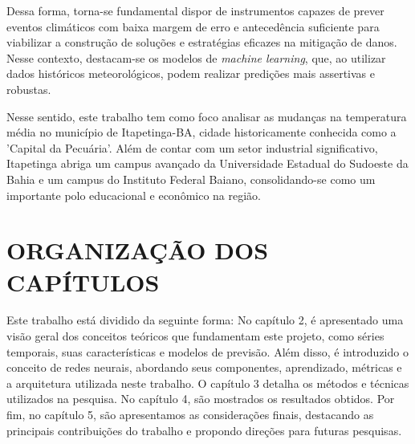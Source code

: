     
    Dessa forma, torna-se fundamental dispor de instrumentos capazes de prever eventos climáticos com baixa margem de erro 
    e antecedência suficiente para viabilizar a construção de soluções e estratégias eficazes na mitigação de danos. 
    Nesse contexto, destacam-se os modelos de \emph{machine learning}, que, ao utilizar dados históricos meteorológicos, podem 
    realizar predições mais assertivas e robustas.
    
    Nesse sentido, este trabalho tem como foco analisar as mudanças na temperatura média no município de Itapetinga-BA, 
    cidade historicamente conhecida como a 'Capital da Pecuária'. Além de contar com um setor industrial 
    significativo, Itapetinga abriga um campus avançado da Universidade Estadual do Sudoeste da Bahia e um campus 
    do Instituto Federal Baiano, consolidando-se como um importante polo educacional e econômico na região.

\section{ORGANIZAÇÃO DOS CAPÍTULOS}
    Este trabalho está dividido da seguinte forma: No capítulo 2, é apresentado uma visão geral dos conceitos teóricos que 
    fundamentam este projeto, como séries temporais, suas características e modelos de previsão. Além disso, é introduzido o 
    conceito de redes neurais, abordando seus componentes, aprendizado, métricas e a arquitetura utilizada neste trabalho. O capítulo 3 
    detalha os métodos e técnicas utilizados na pesquisa. No capítulo 4, são mostrados os resultados obtidos. Por fim, no 
    capítulo 5, são apresentamos as considerações finais, destacando as principais contribuições do trabalho e propondo direções 
    para futuras pesquisas.